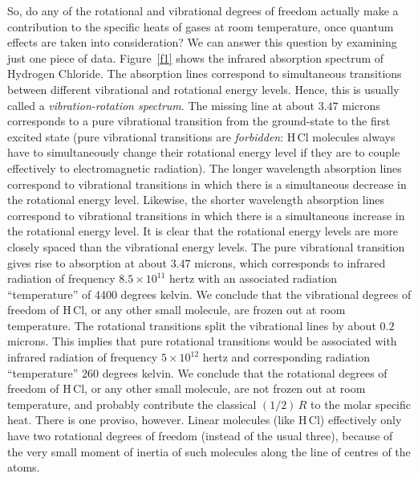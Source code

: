 So,  do any of the rotational and vibrational degrees of freedom
actually make a contribution to the specific heats of gases at room temperature,
once quantum effects are taken into consideration? We can answer this 
question by 
examining just  one piece of data. Figure~\ref{f1} shows the 
infrared absorption spectrum of Hydrogen Chloride. The absorption lines correspond
to simultaneous transitions between different vibrational and rotational energy
levels. Hence, this is usually called a {\em vibration-rotation spectrum}. The missing
line at about $3.47$ microns corresponds to a pure vibrational transition from the
ground-state to the first excited state (pure vibrational transitions are
{\em forbidden}: H\,Cl molecules always have to simultaneously change their rotational energy level if they are to couple effectively to electromagnetic radiation).
The longer wavelength absorption lines correspond to vibrational transitions in
which there is a simultaneous decrease in the rotational energy level. 
Likewise, the
shorter wavelength absorption lines correspond to vibrational transitions in which
there is a simultaneous increase in the rotational energy level. It is clear that
the rotational energy levels are more closely spaced than the vibrational energy
levels. The pure vibrational transition gives rise to absorption at
about $3.47$ microns, which corresponds to infrared radiation of frequency
$8.5\times 10^{11}$ hertz with an associated 
 radiation ``temperature'' of 4400 degrees kelvin. We
conclude that
 the vibrational degrees of freedom of H\,Cl, or any other small molecule,
are  frozen out at room temperature. The rotational transitions split the
vibrational lines by about $0.2$ microns. This implies that pure rotational
transitions would be associated with infrared radiation of frequency
$5\times 10^{12}$ hertz and  corresponding
radiation ``temperature'' 260 degrees kelvin. We 
conclude that the rotational degrees of freedom of H\,Cl, or any other small
molecule, are not frozen out at room temperature, and probably contribute the
classical $(1/2)\,R$ to the molar specific heat. There is one proviso, however.
Linear molecules (like H\,Cl)  effectively only have two rotational degrees of
freedom (instead of the usual three), because of the very small moment 
of inertia of such  molecules along the line of centres of the atoms.

